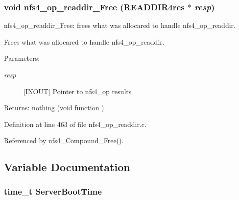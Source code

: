 \subsubsection{\setlength{\rightskip}{0pt plus 5cm}void nfs4\_\-op\_\-readdir\_\-Free (READDIR4res $\ast$ {\em resp})}\label{nfs4__op__readdir_8c_a4}


nfs4\_\-op\_\-readdir\_\-Free: frees what was allocared to handle nfs4\_\-op\_\-readdir.

Frees what was allocared to handle nfs4\_\-op\_\-readdir.

\begin{Desc}
\item[Parameters:]
\begin{description}
\item[{\em resp}][INOUT] Pointer to nfs4\_\-op results\end{description}
\end{Desc}
\begin{Desc}
\item[Returns:]nothing (void function ) \end{Desc}


Definition at line 463 of file nfs4\_\-op\_\-readdir.c.

Referenced by nfs4\_\-Compound\_\-Free().

\subsection{Variable Documentation}
\subsubsection{\setlength{\rightskip}{0pt plus 5cm}time\_\-t {\bf Server\-Boot\-Time}}\label{nfs4__op__readdir_8c_a2}


